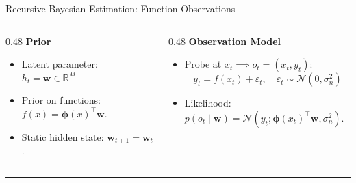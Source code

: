 \documentclass[18pt,aspectratio=149]{beamer}
\begin{document}
\begin{frame}{Recursive Bayesian Estimation: Function Observations}
    \begin{columns}[T,onlytextwidth]
        \begin{column}{0.48\textwidth}
            \textbf{\textcolor{blue!80!black}{Prior}}
            \begin{itemize}
                \item Latent parameter: $h_t = \mathbf{w} \in \mathbb{R}^M$
                \item Prior on functions: $f(x) = \boldsymbol{\phi}(x)^\top \mathbf{w}$.
                \item Static hidden state: $\mathbf{w}_{t+1} = \mathbf{w}_t$.
            \end{itemize}
        \end{column}

        \begin{column}{0.48\textwidth}
            \textbf{\textcolor{teal!90!black}{Observation Model}}
            \begin{itemize}
                \item Probe at $x_t \implies o_t = (x_t, y_t)$:
                \vspace{-0.7em}
                \[
                    y_t = f(x_t) + \varepsilon_t, \quad \varepsilon_t \sim \mathcal{N}(0, \sigma_n^2)
                \]
                \vspace{-1.5em}
                \item Likelihood: $p(o_t \mid \mathbf{w}) = \mathcal{N}(y_t; \boldsymbol{\phi}(x_t)^\top \mathbf{w}, \sigma_n^2)$.
            \end{itemize}
        \end{column}
    \end{columns}

    \vspace{0.25em}
    \hrule
    \vspace{0.2em}


\end{frame}
\end{document}
